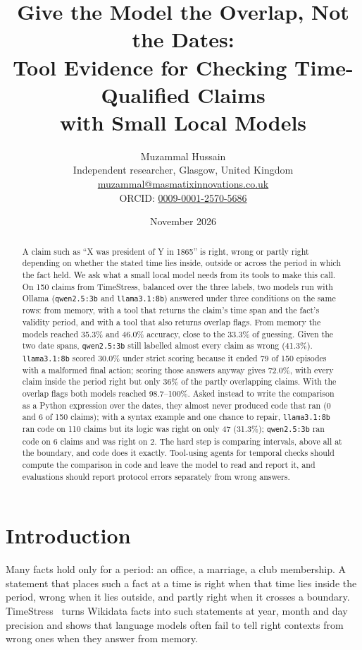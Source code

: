 \documentclass[11pt,a4paper]{article}
\title{\textbf{Give the Model the Overlap, Not the Dates:\\Tool Evidence for Checking Time-Qualified Claims\\with Small Local Models}}
\author{Muzammal Hussain\\
\small Independent researcher, Glasgow, United Kingdom\\
\small \href{mailto:muzammal@masmatixinnovations.co.uk}{muzammal@masmatixinnovations.co.uk}\\
\small ORCID: \href{https://orcid.org/0009-0001-2570-5686}{0009-0001-2570-5686}}
\date{\small November 2026}
\newcommand{\code}[1]{\texttt{#1}}
\begin{document}
\maketitle

\begin{abstract}
\noindent
A claim such as ``X was president of Y in 1865'' is right, wrong or partly right depending on whether the stated time
lies inside, outside or across the period in which the fact held. We ask what a small local model needs from its
tools to make this call. On 150 claims from TimeStress, balanced over the three labels, two models run with Ollama
(\code{qwen2.5:3b} and \code{llama3.1:8b}) answered under three conditions on the same rows: from memory, with a tool
that returns the claim's time span and the fact's validity period, and with a tool that also returns overlap flags.
From memory the models reached 35.3\% and 46.0\% accuracy, close to the 33.3\% of guessing. Given the two date spans,
\code{qwen2.5:3b} still labelled almost every claim as wrong (41.3\%). \code{llama3.1:8b} scored 30.0\% under strict
scoring because it ended 79 of 150 episodes with a malformed final action; scoring those answers anyway gives 72.0\%,
with every claim inside the period right but only 36\% of the partly overlapping claims. With the overlap flags both
models reached 98.7--100\%. Asked instead to write the comparison as a Python expression over the dates, they almost
never produced code that ran (0 and 6 of 150 claims); with a syntax example and one chance to repair, \code{llama3.1:8b}
ran code on 110 claims but its logic was right on only 47 (31.3\%); \code{qwen2.5:3b} ran code on 6 claims and was right on 2. The hard step is comparing intervals, above all at the boundary, and code does it
exactly. Tool-using agents for temporal checks should compute the comparison in code and leave the model to read and
report it, and evaluations should report protocol errors separately from wrong answers.
\end{abstract}

\section{Introduction}

Many facts hold only for a period: an office, a marriage, a club membership. A statement that places such a fact at
a time is right when that time lies inside the period, wrong when it lies outside, and partly right when it crosses a
boundary. TimeStress~\cite{khodja2025timestress} turns Wikidata facts into such statements at year, month and day
precision and shows that language models often fail to tell right contexts from wrong ones when they answer from
memory.
\end{document}
